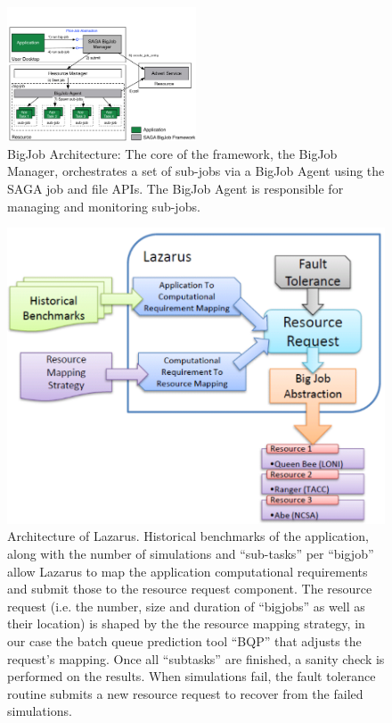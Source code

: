 \documentclass{acm_proc_article-sp}
\newcommand{\jhanote}[1]{ {\textcolor{red} { ***Jha: #1 }}}
\newcommand{\jhanote}[1]{}
\begin{document}
\begin{figure}[ht]
    \centering
    \includegraphics[width=0.5\textwidth]{./bigjob.pdf}
   \caption{BigJob Architecture: The core of the framework, the
      BigJob Manager, orchestrates a set of sub-jobs via a
      BigJob Agent using the SAGA job and file APIs.  The
      BigJob Agent is responsible for managing and monitoring sub-jobs.}
   \label{fig:bigjob}
\end{figure}


\begin{figure}
\centering
\includegraphics[scale=0.55]{figures/Lazarus.pdf}

\caption{Architecture of Lazarus. Historical benchmarks
of the application, along with the number of simulations and ``sub-tasks''
per ``bigjob'' allow Lazarus to map the application computational requirements
and submit those to the resource request component. The resource request
(i.e. the number, size and duration of ``bigjobs'' as well as their location)
is shaped by the the resource mapping strategy, in our case the batch queue
prediction tool ``BQP'' that adjusts the request's mapping. Once all ``subtasks''
are finished, a sanity check is performed on the results. When simulations fail, the fault
tolerance routine submits a new resource request to recover from the failed simulations.}
\label{fig:application_architecture}

\end{figure}
\end{document}
